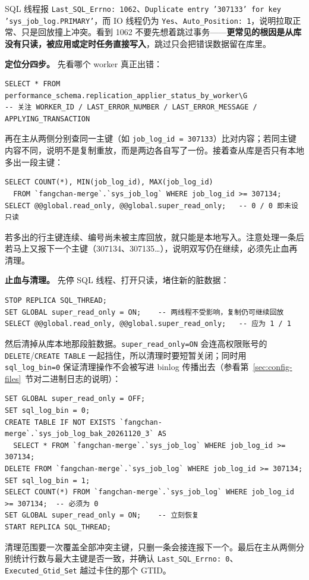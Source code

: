 \documentclass[12pt,UTF8]{ctexbook}
\begin{document}
SQL 线程报 \texttt{Last\_SQL\_Errno: 1062}、\texttt{Duplicate entry '307133' for key 'sys\_job\_log.PRIMARY'}，而 IO 线程仍为 \texttt{Yes}、\texttt{Auto\_Position: 1}，说明拉取正常、只是回放撞上冲突。看到 1062 不要先想着跳过事务——\textbf{更常见的根因是从库没有只读，被应用或定时任务直接写入}，跳过只会把错误数据留在库里。

\textbf{定位分四步。} 先看哪个 worker 真正出错：
\begin{lstlisting}
SELECT * FROM performance_schema.replication_applier_status_by_worker\G
-- 关注 WORKER_ID / LAST_ERROR_NUMBER / LAST_ERROR_MESSAGE / APPLYING_TRANSACTION
\end{lstlisting}
再在主从两侧分别查同一主键（如 \texttt{job\_log\_id = 307133}）比对内容；若同主键内容不同，说明不是复制重放，而是两边各自写了一份。接着查从库是否只有本地多出一段主键：
\begin{lstlisting}
SELECT COUNT(*), MIN(job_log_id), MAX(job_log_id)
  FROM `fangchan-merge`.`sys_job_log` WHERE job_log_id >= 307134;
SELECT @@global.read_only, @@global.super_read_only;   -- 0 / 0 即未设只读
\end{lstlisting}
若多出的行主键连续、编号尚未被主库回放，就只能是本地写入。注意处理一条后若马上又报下一个主键（307134、307135\ldots），说明双写仍在继续，必须先止血再清理。

\textbf{止血与清理。} 先停 SQL 线程、打开只读，堵住新的脏数据：
\begin{lstlisting}
STOP REPLICA SQL_THREAD;
SET GLOBAL super_read_only = ON;    -- 两线程不受影响，复制仍可继续回放
SELECT @@global.read_only, @@global.super_read_only;   -- 应为 1 / 1
\end{lstlisting}
然后清掉从库本地那段脏数据。\texttt{super\_read\_only=ON} 会连高权限账号的 \texttt{DELETE}/\texttt{CREATE TABLE} 一起挡住，所以清理时要短暂关闭；同时用 \texttt{sql\_log\_bin=0} 保证清理操作不会被写进 binlog 传播出去（参看第~\ref{sec:config-files}~节对二进制日志的说明）：
\begin{lstlisting}
SET GLOBAL super_read_only = OFF;
SET sql_log_bin = 0;
CREATE TABLE IF NOT EXISTS `fangchan-merge`.`sys_job_log_bak_20261120_3` AS
  SELECT * FROM `fangchan-merge`.`sys_job_log` WHERE job_log_id >= 307134;
DELETE FROM `fangchan-merge`.`sys_job_log` WHERE job_log_id >= 307134;
SET sql_log_bin = 1;
SELECT COUNT(*) FROM `fangchan-merge`.`sys_job_log` WHERE job_log_id >= 307134;  -- 必须为 0
SET GLOBAL super_read_only = ON;    -- 立刻恢复
START REPLICA SQL_THREAD;
\end{lstlisting}
清理范围要一次覆盖全部冲突主键，只删一条会接连报下一个。最后在主从两侧分别统计行数与最大主键是否一致，并确认 \texttt{Last\_SQL\_Errno: 0}、\texttt{Executed\_Gtid\_Set} 越过卡住的那个 GTID。
\end{document}
